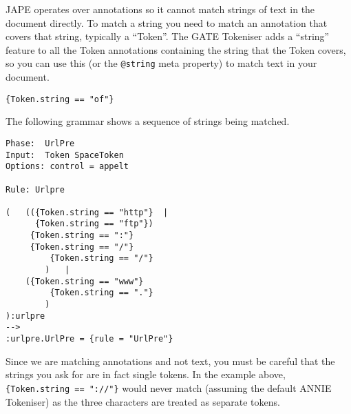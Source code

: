 
JAPE operates over annotations so it cannot match strings of text in the
document directly.  To match a string you need to match an annotation that
covers that string, typically a ``Token''.  The GATE Tokeniser adds a
``string'' feature to all the Token annotations containing the string that the
Token covers, so you can use this (or the \verb|@string| meta property) to
match text in your document.

\begin{small}
\begin{verbatim}
{Token.string == "of"}
\end{verbatim}
\end{small}

The following grammar shows a sequence of strings being matched.

\begin{small}
\begin{verbatim}
Phase:	UrlPre
Input:  Token SpaceToken
Options: control = appelt

Rule: Urlpre

(	(({Token.string == "http"}	|
	  {Token.string == "ftp"})
	 {Token.string == ":"}
	 {Token.string == "/"}
         {Token.string == "/"}
        )	|
	({Token.string == "www"}
         {Token.string == "."}
        )
):urlpre
-->
:urlpre.UrlPre = {rule = "UrlPre"}
\end{verbatim}
\end{small}

Since we are matching annotations and not text, you must be careful that the
strings you ask for are in fact single tokens.  In the example above,
\verb|{Token.string == "://"}| would never match (assuming the default ANNIE
Tokeniser) as the three characters are treated as separate tokens.


